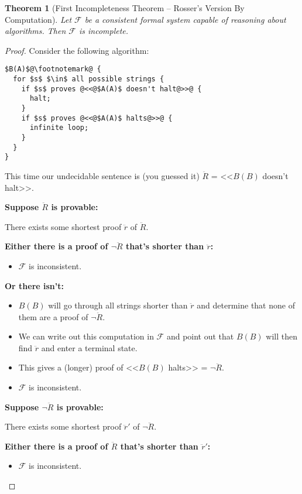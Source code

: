 \documentclass{article}
\theoremstyle{theorem}
\newtheorem{theorem}{Theorem}
\newcommand{\nameditem}[1]{\item\textbf{#1}}
\newcommand{\impl}{\item[$\Rightarrow$]}
\begin{document}
\begin{theorem}[First Incompleteness Theorem -- Rosser's Version By Computation]
Let $\mathcal{F}$ be a consistent formal system capable of reasoning about algorithms. Then $\mathcal{F}$ is incomplete.
\end{theorem}

\begin{proof}
Consider the following algorithm:\\[0.5em]
\begin{minipage}{\linewidth}
\begin{lstlisting}
$B(A)$@\footnotemark@ {
  for $s$ $\in$ all possible strings {
    if $s$ proves @<<@$A(A)$ doesn't halt@>>@ {
      halt;
    }
    if $s$ proves @<<@$A(A)$ halts@>>@ {
      infinite loop;
    }
  }
}
\end{lstlisting}
\end{minipage}
This time our undecidable sentence is (you guessed it) $\ddot{R}$ = <<$B(B)$ doesn't halt>>.
\begin{description}
\nameditem{Suppose $\ddot{R}$ is provable:}
\begin{description}
\impl There exists some shortest proof $\ddot{r}$ of $\ddot{R}$.
\nameditem{Either there is a proof of $\neg \ddot{R}$ that's shorter than $\ddot{r}$:}
\begin{itemize}
\impl $\mathcal{F}$ is inconsistent. \lightning
\end{itemize}
\nameditem{Or there isn't:}
\begin{itemize}
\impl $B(B)$ will go through all strings shorter than $\ddot{r}$ and determine that none of them are a proof of $\neg \ddot{R}$.
\impl We can write out this computation in $\mathcal{F}$ and point out that $B(B)$ will then find $\ddot{r}$ and enter a terminal state.
\impl This gives a (longer) proof of <<$B(B)$ halts>> = $\neg \ddot{R}$.
\impl $\mathcal{F}$ is inconsistent. \lightning
\end{itemize}
\end{description}
\nameditem{Suppose $\neg \ddot{R}$ is provable:}
\begin{description}
\impl There exists some shortest proof $\ddot{r}'$ of $\neg \ddot{R}$.
\nameditem{Either there is a proof of $\ddot{R}$ that's shorter than $\ddot{r}'$:}
\begin{itemize}
\impl $\mathcal{F}$ is inconsistent. \lightning

\end{itemize}
\end{description}
\end{description}
\end{proof}
\end{document}
